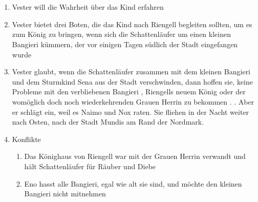 \documentclass[12pt,a4paper,onecolumn,twoside,ngerman]{book}
\newcommand{\Sena}{Sena}
\newcommand{\Sturmkind}{Sturmkind}
\newcommand{\Bangiri}{Bangieri}
\newcommand{\Schattenlaufer}{Schattenläufer}
\newcommand{\Eno}{Eno}
\newcommand{\Nox}{Nox}
\newcommand{\Lobarn}{Lobarn}
\newcommand{\Vester}{Vester}
\newcommand{\Naimo}{Naimo}
\newcommand{\Nordmark}{Nordmark}
\newcommand{\Rhingell}{Riengell}
\newcommand{\Mundis}{Mundis}
\begin{document}
\section[Das Geschäft mit \Lobarn]{}
\begin{enumerate}
  \item {\Vester} will die Wahrheit über das Kind erfahren
  \item {\Vester} bietet drei Boten, die das Kind nach {\Rhingell} begleiten sollten, um es zum König zu bringen, wenn sich die {\Schattenlaufer} um einen kleinen {\Bangiri} kümmern, der vor einigen Tagen südlich der Stadt eingefangen wurde
  \item {\Vester} glaubt, wenn die {\Schattenlaufer} zusammen mit dem kleinen {\Bangiri} und dem {\Sturmkind} {\Sena} aus der Stadt verschwinden, dann hoffen sie, keine Probleme mit den verbliebenen {\Bangiri} , {\Rhingell}s neuem König oder der womöglich doch noch wiederkehrenden Grauen Herrin zu bekommen
.\linebreak
. Aber er schlägt ein, weil es {\Naimo} und {\Nox} raten. Sie fliehen in der Nacht weiter nach Osten, nach der Stadt {\Mundis} am Rand der {\Nordmark}.
  \item Konflikte
  \begin{enumerate}
    \item Das Könighaus von {\Rhingell} war mit der Grauen Herrin verwandt und hält {\Schattenlaufer} für Räuber und Diebe
    \item {\Eno} hasst alle {\Bangiri}, egal wie alt sie sind, und möchte den kleinen {\Bangiri} nicht mitnehmen
  \end{enumerate}  
\end{enumerate}


\end{document}
